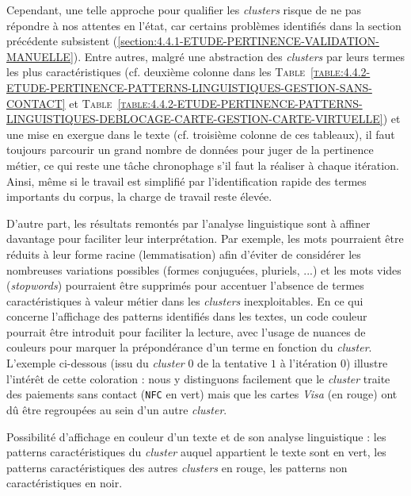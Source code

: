 			Cependant, une telle approche pour qualifier les \textit{clusters} risque de ne pas répondre à nos attentes en l'état, car certains problèmes identifiés dans la section précédente subsistent (\ref{section:4.4.1-ETUDE-PERTINENCE-VALIDATION-MANUELLE}).
			Entre autres, malgré une abstraction des \textit{clusters} par leurs termes les plus caractéristiques (cf. deuxième colonne dans les \textsc{Table~\ref{table:4.4.2-ETUDE-PERTINENCE-PATTERNS-LINGUISTIQUES-GESTION-SANS-CONTACT}} et \textsc{Table~\ref{table:4.4.2-ETUDE-PERTINENCE-PATTERNS-LINGUISTIQUES-DEBLOCAGE-CARTE-GESTION-CARTE-VIRTUELLE}}) et une mise en exergue dans le texte (cf. troisième colonne de ces tableaux), il faut toujours parcourir un grand nombre de données pour juger de la pertinence métier, ce qui reste une tâche chronophage s'il faut la réaliser à chaque itération.
			Ainsi, même si le travail est simplifié par l'identification rapide des termes importants du corpus, la charge de travail reste élevée.
			
			D'autre part, les résultats remontés par l'analyse linguistique sont à affiner davantage pour faciliter leur interprétation.
			Par exemple, les mots pourraient être réduits à leur forme racine (lemmatisation) afin d'éviter de considérer les nombreuses variations possibles (formes conjuguées, pluriels, ...) et les mots vides (\textit{stopwords}) pourraient être supprimés pour accentuer l'absence de termes caractéristiques à valeur métier dans les \textit{clusters} inexploitables.
			En ce qui concerne l'affichage des patterns identifiés dans les textes, un code couleur pourrait être introduit pour faciliter la lecture, avec l'usage de nuances de couleurs pour marquer la prépondérance d'un terme en fonction du \textit{cluster}.
			L'exemple ci-dessous (issu du \textit{cluster} $0$ de la tentative $1$ à l'itération $0$) illustre l'intérêt de cette coloration : nous y distinguons facilement que le \textit{cluster} traite des paiements sans contact (\texttt{NFC} en vert) mais que les cartes \textit{Visa} (en rouge) ont dû être regroupées au sein d'un autre \textit{cluster}.

			\begin{leftBarExamples}
				Possibilité d'affichage en couleur d'un texte et de son analyse linguistique : les patterns caractéristiques du \textit{cluster} auquel appartient le texte sont en vert, les patterns caractéristiques des autres \textit{clusters} en rouge, les patterns non caractéristiques en noir.
				\begin{quote}
				\end{quote}
			\end{leftBarExamples}
			
